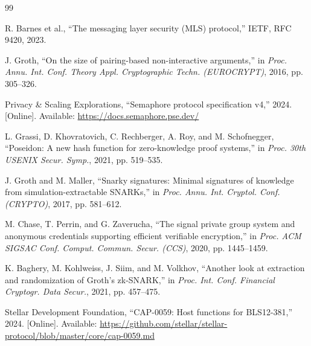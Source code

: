 \documentclass{IEEEcsmag}
\begin{document}
\begin{thebibliography}{99}

R. Barnes et al., ``The messaging layer security (MLS) protocol,'' IETF, RFC 9420, 2023.

J. Groth, ``On the size of pairing-based non-interactive arguments,'' in \emph{Proc. Annu. Int. Conf. Theory Appl. Cryptographic Techn. (EUROCRYPT)}, 2016, pp. 305--326.


Privacy \& Scaling Explorations, ``Semaphore protocol specification v4,'' 2024. [Online]. Available: \url{https://docs.semaphore.pse.dev/}

L. Grassi, D. Khovratovich, C. Rechberger, A. Roy, and M. Schofnegger, ``Poseidon: A new hash function for zero-knowledge proof systems,'' in \emph{Proc. 30th USENIX Secur. Symp.}, 2021, pp. 519--535.

J. Groth and M. Maller, ``Snarky signatures: Minimal signatures of knowledge from simulation-extractable SNARKs,'' in \emph{Proc. Annu. Int. Cryptol. Conf. (CRYPTO)}, 2017, pp. 581--612.

M. Chase, T. Perrin, and G. Zaverucha, ``The signal private group system and anonymous credentials supporting efficient verifiable encryption,'' in \emph{Proc. ACM SIGSAC Conf. Comput. Commun. Secur. (CCS)}, 2020, pp. 1445--1459.


K. Baghery, M. Kohlweiss, J. Siim, and M. Volkhov, ``Another look at extraction and randomization of Groth's zk-SNARK,'' in \emph{Proc. Int. Conf. Financial Cryptogr. Data Secur.}, 2021, pp. 457--475.

Stellar Development Foundation, ``CAP-0059: Host functions for BLS12-381,'' 2024. [Online]. Available: \url{https://github.com/stellar/stellar-protocol/blob/master/core/cap-0059.md}


\end{thebibliography}
\end{document}
